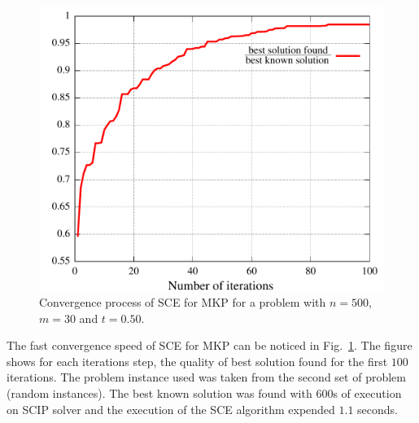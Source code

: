 \begin{figure}
  \centering
  \includegraphics[scale=0.5]{imgs/iter}
  \caption{Convergence process of SCE for MKP
    for a problem with $n=500$, $m=30$ and $t=0.50$.}
  \label{fig:iter}
\end{figure}

The fast convergence speed of SCE for MKP can be noticed in Fig.~\ref{fig:iter}.
The figure shows for each iterations step, the quality of best solution found
for the first $100$ iterations.
The problem instance used was taken from the second set of problem (random instances).
The best known solution was found with $600$s of execution on SCIP solver and
the execution of the SCE algorithm expended $1.1$ seconds.
